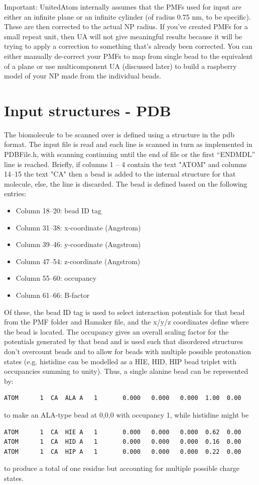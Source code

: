 \documentclass[10pt,a4paper,onecolumn]{report}
\begin{document}
Important: UnitedAtom internally assumes that the PMFs used for input are either an infinite plane or an infinite cylinder (of radius 0.75 nm, to be specific). These are then corrected to the actual NP radius. If you've created PMFs for a small repeat unit, then UA will not give meaningful results because it will be trying to apply a correction to something that's already been corrected. You can either manually de-correct your PMFs to map from single bead to the equivalent of a plane or use multicomponent UA (discussed later) to build a raspberry model of your NP made from the individual beads. 

\section{Input structures - PDB}
The biomolecule to be scanned over is defined using a structure in the pdb format. The input file is read and each line is scanned in turn as implemented in PDBFile.h, with scanning continuing until the end of file or the first ``ENDMDL'' line is reached. Briefly, if columns 1 -- 4 contain the text "ATOM" and columns 14--15 the text "CA" then a bead is added to the internal structure for that molecule, else, the line is discarded.  The bead is defined based on the following entries:
\begin{itemize}
\item Column 18--20: bead ID tag
\item Column 31--38: x-coordinate (Angstrom)
\item Column 39--46: y-coordinate (Angstrom)
\item Column 47--54: z-coordinate (Angstrom)
\item Column 55--60: occupancy
\item Column 61--66: B-factor
\end{itemize}


Of these, the bead ID tag is used to select interaction potentials for that bead from the PMF folder and Hamaker file, and the x/y/z coordinates define where the bead is located. The occupancy gives an overall scaling factor for the potentials generated by that bead and is used such that disordered structures don't overcount beads and to allow for beads with multiple possible protonation states (e.g. histidine can be modelled as a HIE, HID, HIP bead triplet with occupancies summing to unity).  Thus, a single alanine bead can be represented by:

\begin{lstlisting}
ATOM      1  CA  ALA A   1       0.000   0.000   0.000  1.00  0.00
\end{lstlisting}
to make an ALA-type bead at 0,0,0 with occupancy 1, while histidine might be
\begin{lstlisting}
ATOM      1  CA  HIE A   1       0.000   0.000   0.000  0.62  0.00
ATOM      1  CA  HID A   1       0.000   0.000   0.000  0.16  0.00
ATOM      1  CA  HIP A   1       0.000   0.000   0.000  0.22  0.00
\end{lstlisting}
to produce a total of one residue but accounting for multiple possible charge states.
\end{document}
